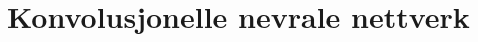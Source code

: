 \documentclass[8pt]{beamer}
\def\nodesize{14pt}
\begin{document}



	\section{Konvolusjonelle nevrale nettverk}

\end{document}

